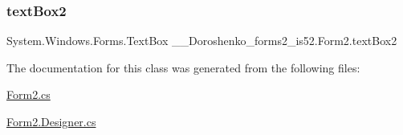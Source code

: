 \subsubsection{\texorpdfstring{text\+Box2}{textBox2}}
{\footnotesize\ttfamily System.\+Windows.\+Forms.\+Text\+Box \+\_\+\_\+\+Doroshenko\+\_\+forms2\+\_\+is52.\+Form2.\+text\+Box2\hspace{0.3cm}{\ttfamily [package]}}



The documentation for this class was generated from the following files\+:\begin{DoxyCompactItemize}
\item 
\hyperlink{_form2_8cs}{Form2.\+cs}\item 
\hyperlink{_form2_8_designer_8cs}{Form2.\+Designer.\+cs}\end{DoxyCompactItemize}
